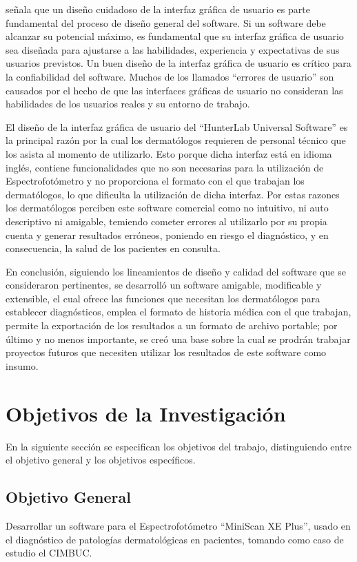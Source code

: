 \cite{Sommerville} se\~{n}ala que un dise\~{n}o cuidadoso de la interfaz gr\'{a}fica de usuario es parte fundamental del proceso de dise\~{n}o general del software. Si un software debe alcanzar su potencial m\'{a}ximo, es fundamental que su interfaz gr\'{a}fica de usuario sea dise\~{n}ada para ajustarse a las habilidades, experiencia y expectativas de sus usuarios previstos. Un buen dise\~{n}o de la interfaz gr\'{a}fica de usuario es cr\'{i}tico para la confiabilidad del software. Muchos de los llamados ``errores de usuario'' son causados por el hecho de que las interfaces gr\'{a}ficas de usuario no consideran las habilidades de los usuarios reales y su entorno de trabajo.

El dise\~{n}o de la interfaz gr\'{a}fica de usuario del ``HunterLab Universal Software'' es la principal raz\'{o}n por la cual los dermat\'{o}logos requieren de personal t\'{e}cnico que los asista al momento de utilizarlo. Esto porque dicha interfaz est\'{a} en idioma ingl\'{e}s, contiene funcionalidades que no son necesarias para la utilizaci\'{o}n de Espectrofot\'{o}metro y no proporciona el formato con el que trabajan los dermat\'{o}logos, lo que dificulta la utilizaci\'{o}n de dicha interfaz. Por estas razones los dermat\'{o}logos perciben este software comercial como no intuitivo, ni auto descriptivo ni amigable, temiendo cometer errores al utilizarlo por su propia cuenta y generar resultados err\'{o}neos, poniendo en riesgo el diagn\'{o}stico, y en consecuencia, la salud de los pacientes en consulta.

En conclusi\'{o}n, siguiendo los lineamientos de dise\~{n}o y calidad del software que se consideraron pertinentes, se desarroll\'{o} un software amigable, modificable y extensible, el cual ofrece las funciones que necesitan los dermat\'{o}logos para establecer diagn\'{o}sticos, emplea el formato de historia m\'{e}dica con el que trabajan, permite la exportaci\'{o}n de los resultados a un formato de archivo portable; por \'{u}ltimo y no menos importante, se cre\'{o} una base sobre la cual se prodr\'{a}n trabajar proyectos futuros que necesiten utilizar los resultados de este software como insumo.
	\newpage

	\section{Objetivos de la Investigaci\'{o}n}
En la siguiente secci\'{o}n se especifican los objetivos del trabajo, distinguiendo entre el objetivo general y los objetivos espec\'{i}ficos.
		\subsection{Objetivo General}
	Desarrollar un software para el Espectrofot\'{o}metro ``MiniScan XE Plus'', usado en el diagn\'{o}stico de patolog\'{i}as dermatol\'{o}gicas en pacientes, tomando como caso de estudio el CIMBUC.
